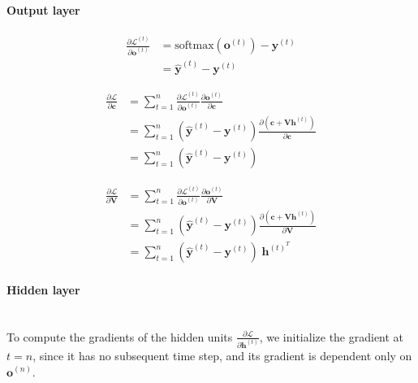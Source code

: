 \documentclass{article}
\begin{document}
\paragraph{Output layer}
\begin{equation}
\label{eqn:backward-o}
\begin{split}
	\frac{\partial \mathcal{L}^{(t)}}{\partial \bm{o}^{(t)}}
		&= \text{softmax}(\bm{o}^{(t)}) - \bm{y}^{(t)} \\
		&= \hat{\bm{y}}^{(t)} - \bm{y}^{(t)}
\end{split}
\end{equation}

\begin{equation}
\label{eqn:backward-c}
\begin{split}
	\frac{\partial \mathcal{L}}{\partial \bm{c}}
		&= \sum_{t=1}^n \frac{\partial \mathcal{L}^{(t)}}{\partial \bm{o}^{(t)}} \frac{\partial \bm{o}^{(t)}}{\partial \bm{c}} \\
		&= \sum_{t=1}^n (\hat{\bm{y}}^{(t)} - \bm{y}^{(t)}) \frac{\partial(\bm{c} + \bm{V}\bm{h}^{(t)})}{\partial \bm{c}} \\
		&= \sum_{t=1}^n (\hat{\bm{y}}^{(t)} - \bm{y}^{(t)})
\end{split}
\end{equation}

\begin{equation}
\label{eqn:backward-V}
\begin{split}
	\frac{\partial \mathcal{L}}{\partial \bm{V}}
		&= \sum_{t=1}^n \frac{\partial \mathcal{L}^{(t)}}{\partial \bm{o}^{(t)}} \frac{\partial \bm{o}^{(t)}}{\partial \bm{V}} \\
		&= \sum_{t=1}^n (\hat{\bm{y}}^{(t)} - \bm{y}^{(t)}) \frac{\partial(\bm{c} + \bm{V}\bm{h}^{(t)})}{\partial \bm{V}} \\
		&= \sum_{t=1}^n (\hat{\bm{y}}^{(t)} - \bm{y}^{(t)}) \; \bm{h}^{(t)^T}
\end{split}
\end{equation}

\paragraph{Hidden layer}\mbox{}\\
To compute the gradients of the hidden units $\frac{\partial \mathcal{L}}{\partial \bm{h}^{(t)}}$, we initialize the gradient at $t = n$, since it has no subsequent time step, and its gradient is dependent only on $\bm{o}^{(n)}$.
\end{document}
